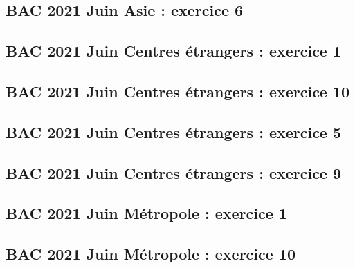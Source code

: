 \documentclass[lang=fr,edition=teacher,layout=sheet]{mxbook}
\begin{document}
\begingroup\endgroup
\par\bigskip
{}\subsection*{BAC 2021 Juin Asie : exercice 6}
\begingroup\endgroup
\par\bigskip
{}\subsection*{BAC 2021 Juin Centres étrangers : exercice 1}
\begingroup\endgroup
\par\bigskip
{}\subsection*{BAC 2021 Juin Centres étrangers : exercice 10}
\begingroup\endgroup
\par\bigskip
{}\subsection*{BAC 2021 Juin Centres étrangers : exercice 5}
\begingroup\endgroup
\par\bigskip
{}\subsection*{BAC 2021 Juin Centres étrangers : exercice 9}
\begingroup\endgroup
\par\bigskip
{}\subsection*{BAC 2021 Juin Métropole : exercice 1}
\begingroup\endgroup
\par\bigskip
{}\subsection*{BAC 2021 Juin Métropole : exercice 10}
\end{document}
